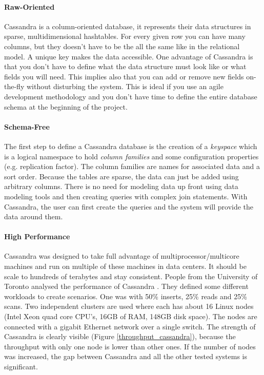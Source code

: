 \documentclass[a4paper]{article}
\begin{document}
\paragraph{Raw-Oriented}
Cassandra is a column-oriented database, it represents their data structures in sparse, multidimensional hashtables. For every given row you can have many columns, but they doesn't have to be the all the same like in the relational model. A unique key makes the data accessible. One advantage of Cassandra is that you don't have to define what the data structure must look like or what fields you will need. This implies also that you can add or remove new fields on-the-fly without disturbing the system. This is ideal if you use an agile development methodology and you don't have time to define the entire database schema at the beginning of the project.

\paragraph{Schema-Free}
The first step to define a Cassandra database is the creation of a \textit{keyspace} which is a logical namespace to hold \textit{column families} and some configuration properties (e.g. replication factor). The column families are names for associated data and a sort order. Because the tables are sparse, the data can just be added using arbitrary columns. There is no need for modeling data up front using data modeling tools and then creating queries with complex join statements. With Cassandra, the user can first create the queries and the system will provide the data around them.

\paragraph{High Performance}
Cassandra was designed to take full advantage of multiprocessor/multicore machines and run on multiple of these machines in data centers. It should be scale to hundreds of terabytes and stay consistent. People from the University of Toronto analysed the performance of Cassandra \cite{rabEtAl2012}. They defined some different workloads to create scenarios. One was with 50\% inserts, 25\% reads and 25\% scans. Two independent clusters are used where each has about 16 Linux nodes (Intel Xeon quad core CPU's, 16GB of RAM, 148GB disk space). The nodes are connected with a gigabit Ethernet network over a single switch. The strength of Cassandra is clearly visible (Figure \ref{throughput_cassandra}), because the throughput with only one node is lower than other ones. If the number of nodes was increased, the gap between Cassandra and all the other tested systems is significant.
\end{document}

